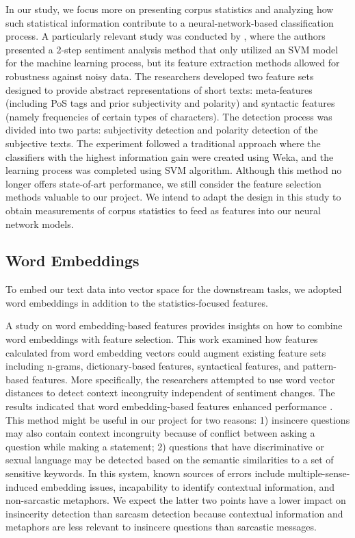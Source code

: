 \documentclass[12pt]{diazessay} %
\begin{document}
In our study, we focus more on presenting corpus statistics and analyzing how such statistical information contribute to a neural-network-based classification process. A particularly relevant study was conducted by \citet{barbosa2010}, where the authors presented a 2-step sentiment analysis method that only utilized an SVM model for the machine learning process, but its feature extraction methods allowed for robustness against noisy data. The researchers developed two feature sets designed to provide abstract representations of short texts: meta-features (including PoS tags and prior subjectivity and polarity) and syntactic features (namely frequencies of certain types of characters). The detection process was divided into two parts: subjectivity detection and polarity detection of the subjective texts. The experiment followed a traditional approach where the classifiers with the highest information gain were created using Weka, and the learning process was completed using SVM algorithm\citep{barbosa2010}. Although this method no longer offers state-of-art performance, we still consider the feature selection methods valuable to our project. We intend to adapt the design in this study to obtain measurements of corpus statistics to feed as features into our neural network models. 
\subsection{Word Embeddings}

To embed our text data into vector space for the downstream tasks, we adopted word embeddings in addition to the statistics-focused features.

A study on word embedding-based features \citep{joshi2016} provides insights on how to combine word embeddings with feature selection. This work examined how features calculated from word embedding vectors could augment existing feature sets including n-grams, dictionary-based features, syntactical features, and pattern-based features. More specifically, the researchers attempted to use word vector distances to detect context incongruity independent of sentiment changes. The results indicated that word embedding-based features enhanced performance \citep{joshi2016}. This method might be useful in our project for two reasons: 1) insincere questions may also contain context incongruity because of conflict between asking a question while making a statement; 2) questions that have discriminative or sexual language may be detected based on the semantic similarities to a set of sensitive keywords.  In this system, known sources of errors include multiple-sense-induced embedding issues, incapability to identify contextual information, and non-sarcastic metaphors\citep{joshi2016}. We expect the latter two points have a lower impact on insincerity detection than sarcasm detection because contextual information and metaphors are less relevant to insincere questions than sarcastic messages. 
\end{document}
